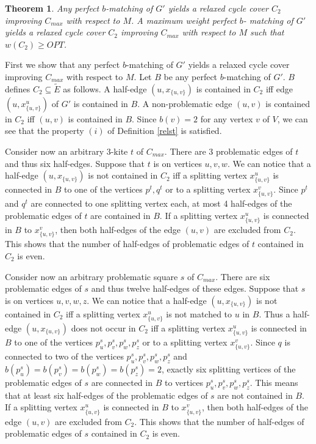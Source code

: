 \documentclass[a4, 11pt]{article}
\newcommand{\dowod}{\noindent{\bf Proof.~}}
\newcommand{\<}{\langle}
\renewcommand{\>}{\rangle}
\newtheorem{theorem}{Theorem}
\begin{document}
\begin{theorem}
Any perfect $b$-matching of $G'$ yields  a relaxed cycle cover  $C_2$  improving $C_{max}$ with respect to $M$.
A maximum weight perfect $b$- matching of $G'$ yields a relaxed cycle cover $C_2$ improving $C_{max}$  with respect to $M$ such that $w(C_2) \geq OPT$.
\end{theorem}
\dowod  First we  show that any perfect $b$-matching of $G'$ yields  a relaxed cycle cover  improving $C_{max}$ with respect to $M$.
Let $B$ be any perfect $b$-matching of $G'$. $B$ defines  $C_2 \subseteq \tilde E$ as follows. A half-edge $(u, x_{\{u,v\}})$  is contained in $C_2$ iff edge  $(u, x^u_{\{u,v\}})$ of $G'$ is contained in $B$. A non-problematic edge $(u,v)$ is contained in $C_2$ iff $(u,v)$ is contained in $B$.
Since $b(v)=2$ for any vertex $v$ of $V$, we can see that  the property $(i)$ of Definition \ref{relst} is satisfied.

Consider now an arbitrary $3$-kite $t$ of $C_{max}$. There are 3 problematic edges of $t$ and thus six half-edges. Suppose that $t$ is on vertices $u,v,w$. We can notice that a half-edge $(u, x_{\{u,v\}})$  is not contained in $C_2$ 
iff a splitting vertex $x^u_{\{u,v\}}$ is connected in $B$ to one of the vertices $p^t, q^t$ or to a splitting vertex $x^v_{\{u,v\}}$. Since $p^t$ and $q^t$ are connected to one splitting vertex each, at most 4 half-edges of the problematic edges of $t$ are contained in $B$. If
 a splitting vertex $x^u_{\{u,v\}}$ is connected in $B$ to  $x^v_{\{u,v\}}$, then both half-edges of the edge $(u,v)$ are excluded from $C_2$.
This shows that the number of half-edges of problematic edges of $t$ contained in $C_2$ is even.

Consider now an arbitrary problematic square $s$ of $C_{max}$. There are six problematic edges of $s$ and thus twelve half-edges of these edges. Suppose that $s$ is on vertices $u,v,w,z$. We can notice that a half-edge $(u, x_{\{u,v\}})$  is not contained in $C_2$ 
iff a splitting vertex $x^u_{\{u,v\}}$ is not matched to $u$ in $B$. Thus a half-edge $(u, x_{\{u,v\}})$ does not occur in $C_2$ iff 
 a splitting vertex $x^u_{\{u,v\}}$ is connected in $B$ to one of the vertices $p^s_u, p^s_v, p^s_w, p^s_z$ or to a splitting vertex $x^v_{\{u,v\}}$.
Since $q$ is connected to two of the vertices $p^s_u, p^s_v, p^s_w, p^s_z$ and $b(p^s_u)=b(p^s_v)= b(p^s_w)= b(p^s_z)=2$, exactly six splitting vertices of the problematic edges of $s$ are connected in $B$ to vertices $p^s_u, p^s_v, p^s_w, p^s_z$. This means  that at least six half-edges of the problematic edges of $s$ are not contained in $B$.  If
 a splitting vertex $x^u_{\{u,v\}}$ is connected in $B$ to  $x^v_{\{u,v\}}$, then both half-edges of the edge $(u,v)$ are excluded from $C_2$.
This shows that the number of half-edges of problematic edges of $s$ contained in $C_2$ is even.
\end{document}

